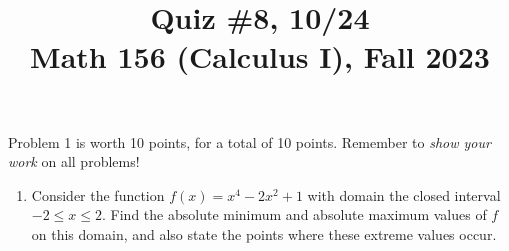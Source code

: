 \documentclass[11pt]{article}
\title{Quiz \#8, 10/24 \\ Math 156 (Calculus I), Fall 2023}
\date{}
\begin{document}
\maketitle

\thispagestyle{empty}

\vspace{-1cm}

Problem 1 is worth 10 points, for a total of 10 points. Remember to \emph{show your work} on all problems!

\begin{enumerate}
\item Consider the function $f(x) = x^4-2x^2+1$ with domain the closed interval $-2 \leq x \leq 2$. Find the absolute minimum and absolute maximum values of $f$ on this domain, and also state the points where these extreme values occur.

\end{enumerate}
\end{document}

